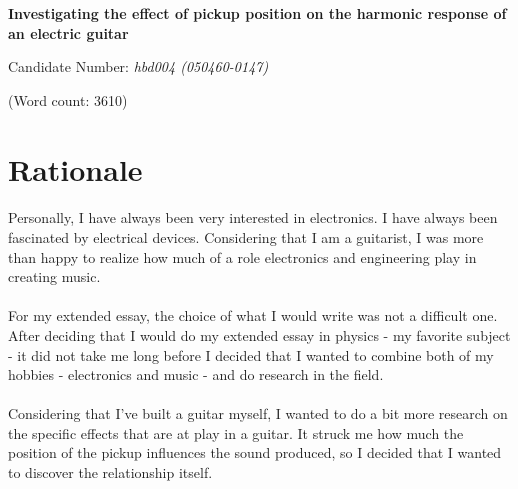 \documentclass{article}
\begin{document}
\begin{titlepage}
	\begin{center}
		\hspace{0pt}
		\vfill
		\huge \textbf{Investigating the effect of pickup position on the
		harmonic response of an electric guitar}

		\vspace{1.0cm}
		\LARGE
		Candidate Number: \textit{hbd004 (050460-0147)}

		\large
		\vspace{0.5cm}
		\begin{flushright}
			(Word count: 3610)
		\end{flushright}

		\vfill
		\hspace{0pt}
	\end{center}
\end{titlepage}

\tableofcontents

\pagebreak


\section{Rationale}

\paragraph*{}
Personally, I have always been very interested in electronics. I have always
been fascinated by electrical devices. Considering that I am a guitarist, I was
more than happy to realize how much of a role electronics and engineering play
in creating music.

\paragraph*{}
For my extended essay, the choice of what I would write was not a difficult
one. After deciding that I would do my extended essay in physics - my favorite
subject - it did not take me long before I decided that I wanted to combine
both of my hobbies - electronics and music - and do research in the field.

\paragraph*{}
Considering that I've built a guitar myself, I wanted to do a bit more research
on the specific effects that are at play in a guitar. It struck me how much the
position of the pickup influences the sound produced, so I decided that I
wanted to discover the relationship itself.
\end{document}
